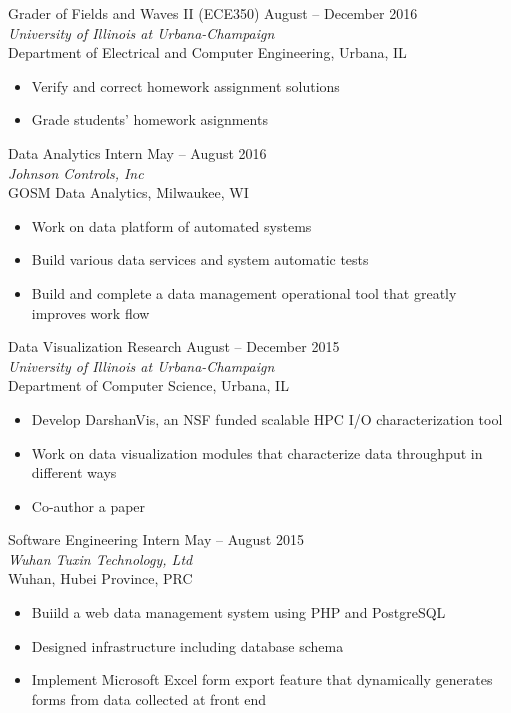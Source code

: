 \documentclass[10pt]{res} %
\begin{document}
\begin{resume}
Grader of Fields and Waves II (ECE350) \hfill August -- December 2016 \\
{\sl University of Illinois at Urbana-Champaign} \\ 
Department of Electrical and Computer Engineering, Urbana, IL 
\begin{itemize} \itemsep -2pt %
    \item Verify and correct homework assignment solutions
    \item Grade students' homework asignments \end{itemize}


Data Analytics Intern \hfill May -- August 2016 \\
{\sl Johnson Controls, Inc} \\ 
GOSM Data Analytics, Milwaukee, WI 
\begin{itemize} \itemsep -2pt %
    \item Work on data platform of automated systems
    \item Build various data services and system automatic tests
    \item Build and complete a data management operational tool that greatly improves work flow 
\end{itemize}

Data Visualization Research \hfill August -- December 2015 \\
{\sl University of Illinois at Urbana-Champaign} \\ 
Department of Computer Science, Urbana, IL 
\begin{itemize} \itemsep -2pt %
    \item Develop DarshanVis, an NSF funded scalable HPC I/O characterization tool 
    \item Work on data visualization modules that characterize data throughput in different ways 
    \item Co-author a paper 
\end{itemize}

Software Engineering Intern \hfill May -- August 2015 \\
{\sl Wuhan Tuxin Technology, Ltd} \\ 
Wuhan, Hubei Province, PRC 
\begin{itemize} \itemsep -2pt %
    \item Buiild a web data management system using PHP and PostgreSQL 
    \item Designed infrastructure including database schema
    \item Implement Microsoft Excel form export feature that dynamically generates forms from data collected at front end
\end{itemize}


\end{resume}
\end{document}
